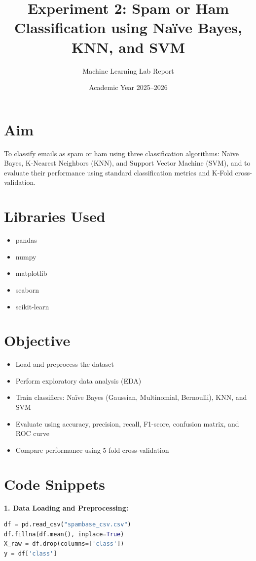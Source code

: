 \documentclass[12pt]{article}
\title{\textbf{Experiment 2: Spam or Ham Classification using Na\"ive Bayes, KNN, and SVM}}
\author{Machine Learning Lab Report}
\date{Academic Year 2025--2026}
\begin{document}
\maketitle

\section*{Aim}
To classify emails as spam or ham using three classification algorithms: Na\"ive Bayes, K-Nearest Neighbors (KNN), and Support Vector Machine (SVM), and to evaluate their performance using standard classification metrics and K-Fold cross-validation.

\section*{Libraries Used}
\begin{itemize}
\item pandas
\item numpy
\item matplotlib
\item seaborn
\item scikit-learn
\end{itemize}

\section*{Objective}
\begin{itemize}
\item Load and preprocess the dataset
\item Perform exploratory data analysis (EDA)
\item Train classifiers: Na\"ive Bayes (Gaussian, Multinomial, Bernoulli), KNN, and SVM
\item Evaluate using accuracy, precision, recall, F1-score, confusion matrix, and ROC curve
\item Compare performance using 5-fold cross-validation
\end{itemize}

\section*{Code Snippets}

\textbf{1. Data Loading and Preprocessing:}
\begin{lstlisting}[language=Python]
df = pd.read_csv("spambase_csv.csv")
df.fillna(df.mean(), inplace=True)
X_raw = df.drop(columns=['class'])
y = df['class']
\end{lstlisting}
\end{document}
